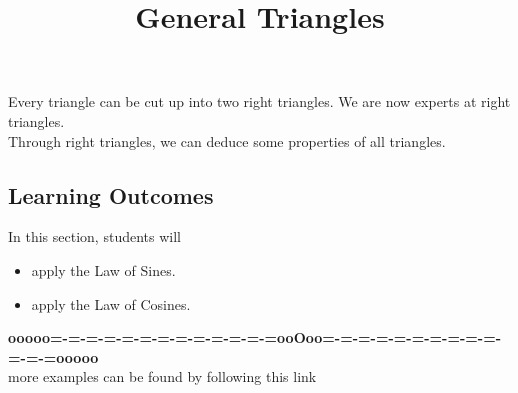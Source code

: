 \documentclass{ximera}
\title{General Triangles}
\begin{document}
\begin{abstract}
\end{abstract}
\maketitle





Every triangle can be cut up into two right triangles.  We are now experts at right triangles. \\




Through right triangles, we can deduce some properties of all triangles.











\subsection{Learning Outcomes}


\begin{sectionOutcomes}
In this section, students will 

\begin{itemize}
\item apply the Law of Sines.
\item apply the Law of Cosines.
\end{itemize}
\end{sectionOutcomes}













\begin{center}
\textbf{\textcolor{green!50!black}{ooooo=-=-=-=-=-=-=-=-=-=-=-=-=ooOoo=-=-=-=-=-=-=-=-=-=-=-=-=ooooo}} \\

more examples can be found by following this link\\ 

\end{center}
\end{document}

